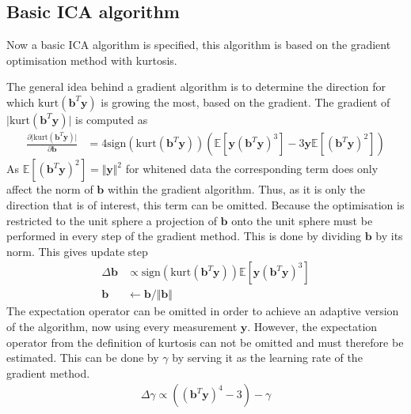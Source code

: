 \subsection{Basic ICA algorithm}\label{sec:gra_kur}
Now a basic ICA algorithm is specified, this algorithm is based on the gradient optimisation method with kurtosis.

The general idea behind a gradient algorithm is to determine the direction for which $\text{kurt}(\textbf{b}^T \textbf{y})$ is growing the most, based on the gradient. 
The gradient of $\vert \text{kurt}(\textbf{b}^T \textbf{y}) \vert$ is computed as
\begin{align}\label{eq:kurt}
\frac{\partial \vert \text{kurt}(\textbf{b}^T \textbf{y})\vert}{\partial \mathbf{b}} &= 4 \text{sign}(\text{kurt}(\textbf{b}^T \textbf{y})) (\mathbb{E}[\mathbf{y} (\textbf{b}^T \textbf{y})^3] - 3 \mathbf{y} \mathbb{E}[(\textbf{b}^T \textbf{y})^2]) 
\end{align} 
As $\mathbb{E}[(\textbf{b}^T \textbf{y})^2] =\Vert \mathbf{y} \Vert^2$ for whitened data the corresponding term does only affect the norm of $\textbf{b}$ within the gradient algorithm. 
Thus, as it is only the direction that is of interest, this term can be omitted. 
Because the optimisation is restricted to the unit sphere a projection of $\textbf{b}$ onto the unit sphere must be performed in every step of the gradient method. 
This is done by dividing $\textbf{b}$ by its norm. 
This gives update step \cite[p. 178]{ICA}
\begin{align*}
\Delta \textbf{b} &\propto \text{sign}\left( \text{kurt}(\textbf{b}^T \textbf{y}) \right) \mathbb{E}[\textbf{y}(\textbf{b}^T \textbf{y})^3] \\
\textbf{b} &\leftarrow \textbf{b}/\Vert \textbf{b} \Vert
\end{align*}  
The expectation operator can be omitted in order to achieve an adaptive version of the algorithm, now using every measurement $\textbf{y}$. 
However, the expectation operator from the definition of kurtosis can not be omitted and must therefore be estimated. 
This can be done by $\gamma$ by serving it as the learning rate of the gradient method.
\begin{align*}
\Delta \gamma \propto((\textbf{b}^T \textbf{y})^4 - 3) - \gamma
\end{align*}


